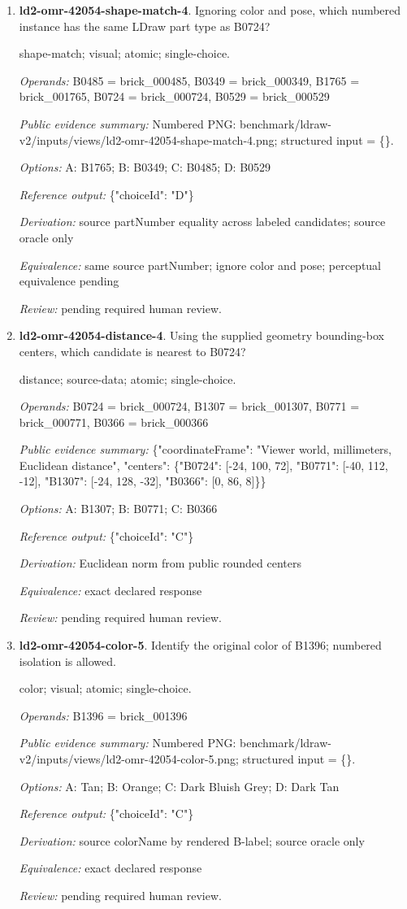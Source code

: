 \begin{enumerate}
\item \textbf{ld2-omr-42054-shape-match-4}. Ignoring color and pose, which numbered instance has the same LDraw part type as B0724?
\par{\small shape-match; visual; atomic; single-choice.\par\textit{Operands:} B0485 = brick\_000485, B0349 = brick\_000349, B1765 = brick\_001765, B0724 = brick\_000724, B0529 = brick\_000529\par\textit{Public evidence summary:} Numbered PNG: benchmark/ldraw-v2/inputs/views/ld2-omr-42054-shape-match-4.png; structured input = \{\}.\par\textit{Options:} A: B1765; B: B0349; C: B0485; D: B0529\par\textit{Reference output:} \{"choiceId": "D"\}\par\textit{Derivation:} source partNumber equality across labeled candidates; source oracle only\par\textit{Equivalence:} same source partNumber; ignore color and pose; perceptual equivalence pending\par\textit{Review:} pending required human review.}
\item \textbf{ld2-omr-42054-distance-4}. Using the supplied geometry bounding-box centers, which candidate is nearest to B0724?
\par{\small distance; source-data; atomic; single-choice.\par\textit{Operands:} B0724 = brick\_000724, B1307 = brick\_001307, B0771 = brick\_000771, B0366 = brick\_000366\par\textit{Public evidence summary:} \{"coordinateFrame": "Viewer world, millimeters, Euclidean distance", "centers": \{"B0724": [-24, 100, 72], "B0771": [-40, 112, -12], "B1307": [-24, 128, -32], "B0366": [0, 86, 8]\}\}\par\textit{Options:} A: B1307; B: B0771; C: B0366\par\textit{Reference output:} \{"choiceId": "C"\}\par\textit{Derivation:} Euclidean norm from public rounded centers\par\textit{Equivalence:} exact declared response\par\textit{Review:} pending required human review.}
\item \textbf{ld2-omr-42054-color-5}. Identify the original color of B1396; numbered isolation is allowed.
\par{\small color; visual; atomic; single-choice.\par\textit{Operands:} B1396 = brick\_001396\par\textit{Public evidence summary:} Numbered PNG: benchmark/ldraw-v2/inputs/views/ld2-omr-42054-color-5.png; structured input = \{\}.\par\textit{Options:} A: Tan; B: Orange; C: Dark Bluish Grey; D: Dark Tan\par\textit{Reference output:} \{"choiceId": "C"\}\par\textit{Derivation:} source colorName by rendered B-label; source oracle only\par\textit{Equivalence:} exact declared response\par\textit{Review:} pending required human review.}

\end{enumerate}
